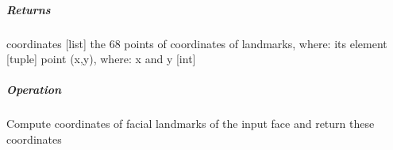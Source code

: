 \subparagraph{Returns}
\begin{changemargin}{1cm}{0cm}
	coordinates [list] the 68 points of coordinates of landmarks, where: its element [tuple] point (x,y), where: x and y [int]
\end{changemargin}

\subparagraph{Operation}
\begin{changemargin}{1cm}{0cm}
	Compute coordinates of facial landmarks of the input face and return these coordinates
\end{changemargin}